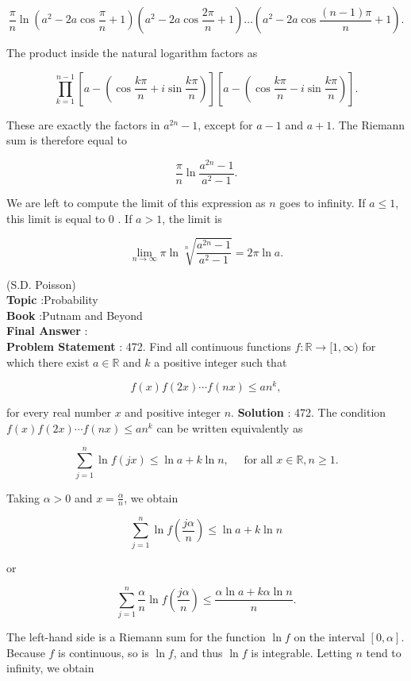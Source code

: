 \documentclass[10pt]{article}
\begin{document}
$$
\frac{\pi}{n} \ln \left(a^{2}-2 a \cos \frac{\pi}{n}+1\right)\left(a^{2}-2 a \cos \frac{2 \pi}{n}+1\right) \ldots\left(a^{2}-2 a \cos \frac{(n-1) \pi}{n}+1\right) .
$$

The product inside the natural logarithm factors as

$$
\prod_{k=1}^{n-1}\left[a-\left(\cos \frac{k \pi}{n}+i \sin \frac{k \pi}{n}\right)\right]\left[a-\left(\cos \frac{k \pi}{n}-i \sin \frac{k \pi}{n}\right)\right] .
$$

These are exactly the factors in $a^{2 n}-1$, except for $a-1$ and $a+1$. The Riemann sum is therefore equal to

$$
\frac{\pi}{n} \ln \frac{a^{2 n}-1}{a^{2}-1} .
$$

We are left to compute the limit of this expression as $n$ goes to infinity. If $a \leq 1$, this limit is equal to 0 . If $a>1$, the limit is

$$
\lim _{n \rightarrow \infty} \pi \ln \sqrt[n]{\frac{a^{2 n}-1}{a^{2}-1}}=2 \pi \ln a .
$$

(S.D. Poisson)
\\
\textbf{Topic} :Probability\\
\textbf{Book} :Putnam and Beyond\\
\textbf{Final Answer} :\\


\textbf{Problem Statement} :
472. Find all continuous functions $f: \mathbb{R} \rightarrow[1, \infty)$ for which there exist $a \in \mathbb{R}$ and $k$ a positive integer such that

$$
f(x) f(2 x) \cdots f(n x) \leq a n^{k},
$$

for every real number $x$ and positive integer $n$. 
\textbf{Solution} :
472. The condition $f(x) f(2 x) \cdots f(n x) \leq a n^{k}$ can be written equivalently as

$$
\sum_{j=1}^{n} \ln f(j x) \leq \ln a+k \ln n, \quad \text { for all } x \in \mathbb{R}, n \geq 1 .
$$

Taking $\alpha>0$ and $x=\frac{\alpha}{n}$, we obtain

$$
\sum_{j=1}^{n} \ln f\left(\frac{j \alpha}{n}\right) \leq \ln a+k \ln n
$$

or

$$
\sum_{j=1}^{n} \frac{\alpha}{n} \ln f\left(\frac{j \alpha}{n}\right) \leq \frac{\alpha \ln a+k \alpha \ln n}{n} .
$$

The left-hand side is a Riemann sum for the function $\ln f$ on the interval $[0, \alpha]$. Because $f$ is continuous, so is $\ln f$, and thus $\ln f$ is integrable. Letting $n$ tend to infinity, we obtain
\end{document}
